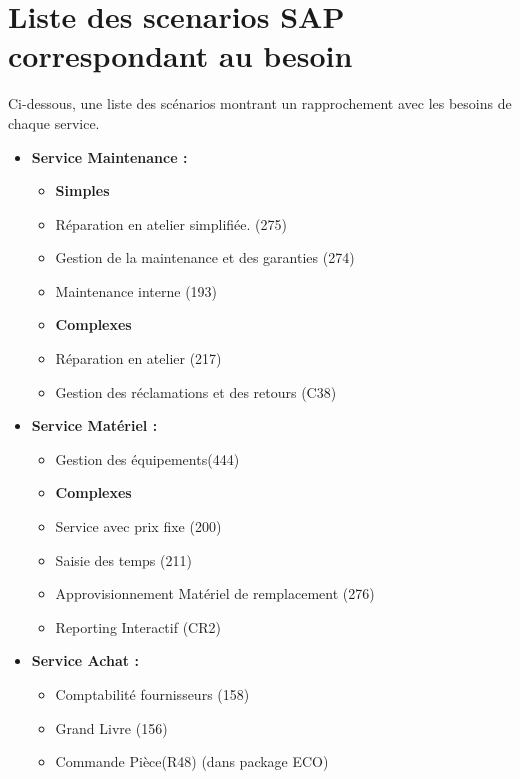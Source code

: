 \section{Liste des scenarios SAP correspondant au besoin}
Ci-dessous, une liste des scénarios montrant un rapprochement avec les 
besoins de chaque service.


\begin{itemize}
\item \textbf{Service Maintenance :} \\

    \begin{itemize}
        \item \textbf{Simples}
        \item Réparation en atelier simplifiée. (275)
        \item Gestion de la maintenance et des garanties (274)
        \item Maintenance interne (193)
        \item \textbf{Complexes}
        \item Réparation en atelier (217)
        \item Gestion des réclamations et des retours (C38)
    \end{itemize}

\item \textbf{Service Matériel : }\\

    \begin{itemize}
        \item Gestion des équipements(444)
        \item \textbf{Complexes}    
        \item Service avec prix fixe (200)
        \item Saisie des temps (211)
        \item Approvisionnement Matériel de remplacement (276)
        \item Reporting Interactif (CR2)
    \end{itemize}

\item \textbf{Service Achat :} \\

    \begin{itemize}
        \item Comptabilité fournisseurs (158)
        \item Grand Livre (156)
        \item Commande Pièce(R48) (dans package ECO)
    \end{itemize}


\end{itemize}
